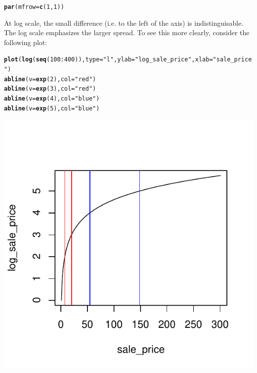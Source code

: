 \documentclass{article}\usepackage[]{graphicx}\usepackage[]{color}
\makeatletter
\def\maxwidth{ %
  \ifdim\Gin@nat@width>\linewidth
    \linewidth
  \else
    \Gin@nat@width
  \fi
}
\newcommand{\hlnum}[1]{\textcolor[rgb]{0.686,0.059,0.569}{#1}}%
\newcommand{\hlstr}[1]{\textcolor[rgb]{0.192,0.494,0.8}{#1}}%
\newcommand{\hlopt}[1]{\textcolor[rgb]{0,0,0}{#1}}%
\newcommand{\hlstd}[1]{\textcolor[rgb]{0.345,0.345,0.345}{#1}}%
\newcommand{\hlkwc}[1]{\textcolor[rgb]{0.333,0.667,0.333}{#1}}%
\newcommand{\hlkwd}[1]{\textcolor[rgb]{0.737,0.353,0.396}{\textbf{#1}}}%
\newenvironment{kframe}{%
 \def\at@end@of@kframe{}%
 \ifinner\ifhmode%
  \def\at@end@of@kframe{\end{minipage}}%
  \begin{minipage}{\columnwidth}%
 \fi\fi%
 \def\FrameCommand##1{\hskip\@totalleftmargin \hskip-\fboxsep
 \colorbox{shadecolor}{##1}\hskip-\fboxsep
     \hskip-\linewidth \hskip-\@totalleftmargin \hskip\columnwidth}%
 \MakeFramed {\advance\hsize-\width
   \@totalleftmargin\z@ \linewidth\hsize
   \@setminipage}}%
 {\par\unskip\endMakeFramed%
 \at@end@of@kframe}
\newenvironment{knitrout}{}{} %
\makeatother
\begin{document}
\begin{enumerate}
\begin{knitrout}
{}


\begin{kframe}\begin{alltt}
\hlkwd{par}\hlstd{(}\hlkwc{mfrow}\hlstd{=}\hlkwd{c}\hlstd{(}\hlnum{1}\hlstd{,} \hlnum{1}\hlstd{))}
\end{alltt}
\end{kframe}
\end{knitrout}
\end{enumerate}

At log scale, the small difference (i.e. to the left of the axis) is indistinguisable. The log scale emphasizes the larger spread. To see this more clearly, consider the following plot:

\begin{knitrout}
\color{fgcolor}\begin{kframe}
\begin{alltt}
\hlkwd{plot}\hlstd{(}\hlkwd{log}\hlstd{(}\hlkwd{seq}\hlstd{(}\hlnum{100}\hlopt{:}\hlnum{400}\hlstd{)),} \hlkwc{type}\hlstd{=}\hlstr{"l"}\hlstd{,} \hlkwc{ylab}\hlstd{=}\hlstr{"log_sale_price"}\hlstd{,} \hlkwc{xlab}\hlstd{=}\hlstr{"sale_price"}\hlstd{)}
\hlkwd{abline}\hlstd{(}\hlkwc{v}\hlstd{=}\hlkwd{exp}\hlstd{(}\hlnum{2}\hlstd{),} \hlkwc{col}\hlstd{=}\hlstr{"red"}\hlstd{)}
\hlkwd{abline}\hlstd{(}\hlkwc{v}\hlstd{=}\hlkwd{exp}\hlstd{(}\hlnum{3}\hlstd{),} \hlkwc{col}\hlstd{=}\hlstr{"red"}\hlstd{)}
\hlkwd{abline}\hlstd{(}\hlkwc{v}\hlstd{=}\hlkwd{exp}\hlstd{(}\hlnum{4}\hlstd{),} \hlkwc{col}\hlstd{=}\hlstr{"blue"}\hlstd{)}
\hlkwd{abline}\hlstd{(}\hlkwc{v}\hlstd{=}\hlkwd{exp}\hlstd{(}\hlnum{5}\hlstd{),} \hlkwc{col}\hlstd{=}\hlstr{"blue"}\hlstd{)}
\end{alltt}
\end{kframe}

{\centering \includegraphics[width=\maxwidth]{figure/unnamed-chunk-16} 

}
\end{knitrout}
\end{document}
